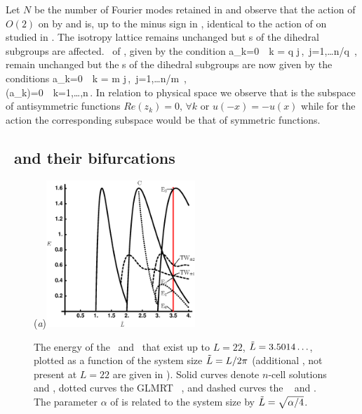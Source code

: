 Let $N$ be the number of Fourier modes retained in 
and observe that the action of $O(2)$
on  by  and  is,
up to the minus sign in , identical
to the action  of  on  studied
in .
The isotropy lattice remains unchanged but \fixedsp s of the dihedral subgroups are affected.
\Fixedsp\ of , given by the condition
\beq
	a_k=0\ \ k = q j\,,\ j=1,\ldots\lfloor n/q \rfloor\,,
	\label{eq:O2CqFix}
\eeq
remain unchanged but the \fixedsp s of the dihedral subgroups  are now given by the conditions
\bea
	a_k=0\ \ k = m j\,,\ j=1,\ldots\lfloor n/m \rfloor\,, \\
	\Re(a_k)=0\ \ k=1,\ldots,n\,.
	\label{eq:O2ksDqFix}
\eea
In relation to physical space we observe that  is the subspace of antisymmetric functions $Re(z_k)=0,\, \forall k$ or $u(-x)=-u(x)$ while for the action  the corresponding
subspace would be that of symmetric functions.

\subsection{\Eqva\ and their bifurcations}
\label{sec:ksBif}

\begin{figure}[ht]
\begin{center}
  (\textit{a})\includegraphics[width=0.5\textwidth]{../figs/ksBifDiag}
\end{center}
\caption[KS steady state bifurcations]{
The energy  of the \eqva\ and \reqva\ that
exist up to $L=22$, $\tilde{L} = 3.5014\ldots$, plotted as a function
of the system size $\tilde{L} = L/2\pi$ (additional \eqva, not present
at $L = 22$ are given in ). Solid curves denote
$n$-cell solutions  and , dotted curves the GLMRT
\eqv\ ,
and dashed curves the \reqva\  and .
The parameter $\alpha$ of  is
related to the system size by $\tilde{L}=\sqrt{\alpha/4}$.    }
\label{fig:ksBifDiag}
\end{figure}

